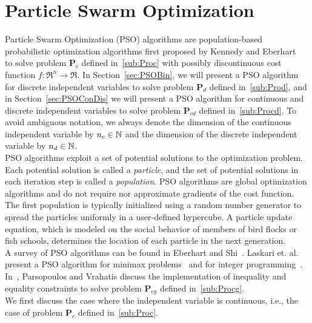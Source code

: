 \section{Particle Swarm Optimization}
\label{sec:PSOAlg}
Particle Swarm Optimization (PSO) algorithms are population-based
probabilistic optimization algorithms first proposed by 
Kennedy and Eberhart~\cite{EberhartKennedy1995,KennedyEberhart1995}
to solve problem $\mathbf P_c$ defined in~\eqref{sub:Proc} with 
possibly discontinuous cost function $f \colon \Re^n \to \Re$.
In Section~\ref{sec:PSOBin}, we will present a PSO algorithm 
for discrete independent variables
to solve problem $\mathbf P_d$ defined in~\eqref{sub:Prod},
and in Section~\ref{sec:PSOConDis} we will present a PSO algorithm for 
continuous and discrete independent variables
to solve problem $\mathbf P_{cd}$ defined in~\eqref{sub:Procd}.
To avoid ambiguous notation, we always denote the dimension of the 
continuous independent variable by $n_c \in {\mathbb N}$ 
and the dimension of the 
discrete independent variable by
$n_d \in {\mathbb N}$.\\

PSO algorithms exploit a set of potential solutions 
to the optimization problem.
Each potential solution is called a {\em particle}, and the set
of potential solutions in each iteration step is called a {\em population}.
PSO algorithms are global optimization algorithms and
do not require nor approximate gradients of the cost function.
The first population is typically initialized using a random number generator to
spread the particles uniformly in a user-defined hypercube.
A particle update equation, which is modeled 
on the social behavior of members
of bird flocks or fish schools,
determines the location of each particle in the next generation.\\

A survey of PSO algorithms can be found in 
Eberhart and Shi~\cite{EberhartShi2001}.
Laskari et. al. present a PSO algorithm for 
minimax problems~\cite{LaskariEtAl2002:1} and for
integer programming~\cite{LaskariEtAl2002:2}.
In~\cite{ParsopoulosVrahatis2002:2}, Parsopoulos and Vrahatis discuss the
implementation of inequality and equality constraints
to solve problem $\mathbf P_{cg}$ defined in~\eqref{sub:Procg}.\\

We first discuss the case where the independent variable is continuous,
i.e., the case of problem $\mathbf P_c$ defined in~\eqref{sub:Proc}.

